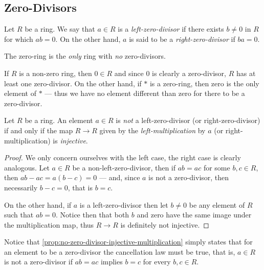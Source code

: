 \subsection{Zero-Divisors}

%
\begin{definition}
\label{def:zero-divisor}
Let \(R\) be a ring. We say that \(a \in R\) is a \emph{left-zero-divisor} if
there exists \(b \neq 0\) in \(R\) for which \(a b = 0\). On the other hand,
\(a\) is said to be a \emph{right-zero-divisor} if \(b a = 0\).
\end{definition}
%

%
\begin{remark}
\label{rem:zero-ring-only-no-zero-divisors}
The zero-ring is the \emph{only} ring with \emph{no} zero-divisors.

If \(R\) is a non-zero ring, then \(0 \in R\) and since \(0\) is clearly a
zero-divisor, \(R\) has at least one zero-divisor. On the other hand, if \(*\)
is a zero-ring, then zero is the only element of \(*\) --- thus we have no
element different than zero for there to be a zero-divisor.
\end{remark}
%

%
\begin{proposition}
\label{prop:no-zero-divisor-injective-multiplication}
Let \(R\) be a ring. An element \(a \in R\) is \emph{not} a left-zero-divisor
(or right-zero-divisor) if and only if the map \(R \to R\) given by the
\emph{left-multiplication} by \(a\) (or right-multiplication) is
\emph{injective}.
\end{proposition}
%

%
\begin{proof}
We only concern ourselves with the left case, the right case is clearly
analogous. Let \(a \in R\) be a non-left-zero-divisor, then if \(a b = a c\) for
some \(b, c \in R\), then \(a b - a c = a (b - c) = 0\) --- and, since \(a\) is
not a zero-divisor, then necessarily \(b - c = 0\), that is \(b = c\).

On the other hand, if \(a\) is a left-zero-divisor then let \(b \neq 0\) be any
element of \(R\) such that \(a b = 0\). Notice then that both \(b\) and zero
have the same image under the multiplication map, thus \(R \to R\) is definitely
not injective.
\end{proof}
%

%
\begin{remark}
\label{rem:no-zero-divisor-is-cancellation-in-disguise}
Notice that \cref{prop:no-zero-divisor-injective-multiplication} simply states
that for an element to be a zero-divisor the cancellation law must be true,
that is, \(a \in R\) is not a zero-divisor if \(a b = a c\) implies \(b = c\)
for every \(b, c \in R\).
\end{remark}
%

